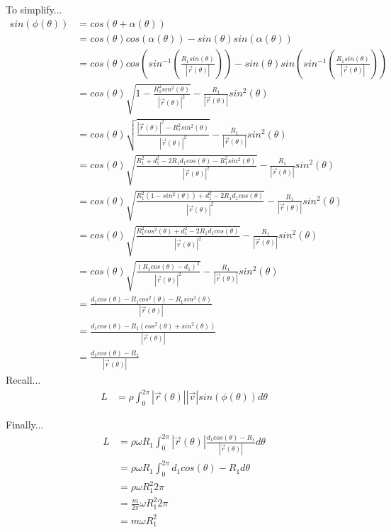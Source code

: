 \documentclass{article}
\begin{document}
	To simplify...
	\begin{align}
		sin(\phi(\theta)) &= cos(\theta + \alpha(\theta)) \\
		 &= cos(\theta)cos(\alpha(\theta)) - sin(\theta)sin(\alpha(\theta)) \\
		 &= cos(\theta)cos(sin^{-1}(\frac{R_1sin(\theta)}{|\vec{r}(\theta)|})) - sin(\theta)sin(sin^{-1}(\frac{R_1sin(\theta)}{|\vec{r}(\theta)|})) \\
		 &= cos(\theta)\sqrt{1-\frac{R_1^2sin^2(\theta)}{|\vec{r}(\theta)|^2}} - \frac{R_1}{|\vec{r}(\theta)|}sin^2(\theta) \\
		 &= cos(\theta)\sqrt{\frac{|\vec{r}(\theta)|^2 - R_1^2sin^2(\theta)}{|\vec{r}(\theta)|^2}} - \frac{R_1}{|\vec{r}(\theta)|}sin^2(\theta) \\
		 &= cos(\theta)\sqrt{\frac{R_1^2+d_1^2-2R_1d_1cos(\theta)- R_1^2sin^2(\theta)}{|\vec{r}(\theta)|^2}} - \frac{R_1}{|\vec{r}(\theta)|}sin^2(\theta) \\
		 &= cos(\theta)\sqrt{\frac{R_1^2(1-sin^2(\theta))+d_1^2-2R_1d_1cos(\theta)}{|\vec{r}(\theta)|^2}} - \frac{R_1}{|\vec{r}(\theta)|}sin^2(\theta) \\
		 &= cos(\theta)\sqrt{\frac{R_1^2cos^2(\theta)+d_1^2-2R_1d_1cos(\theta)}{|\vec{r}(\theta)|^2}} - \frac{R_1}{|\vec{r}(\theta)|}sin^2(\theta) \\
		 &= cos(\theta)\sqrt{\frac{(R_1cos(\theta) - d_1)^2}{|\vec{r}(\theta)|^2}} - \frac{R_1}{|\vec{r}(\theta)|}sin^2(\theta) \\
		 &= \frac{d_1cos(\theta) - R_1cos^2(\theta) - R_1sin^2(\theta)}{|\vec{r}(\theta)|} \\
		 &= \frac{d_1cos(\theta) - R_1(cos^2(\theta) + sin^2(\theta))}{|\vec{r}(\theta)|} \\
		 &= \frac{d_1cos(\theta) - R_1}{|\vec{r}(\theta)|}
	\end{align}
	Recall...
	\begin{align}
		L &= \rho\int_0^{2\pi}|\vec{r}(\theta)||\vec{v}|sin(\phi(\theta))d\theta
	\end{align}

	Finally...
	\begin{align}
		L &=\rho\omega R_1\int_0^{2\pi}|\vec{r}(\theta)|\frac{d_1cos(\theta) - R_1}{|\vec{r}(\theta)|}d\theta \\
		 &= \rho\omega R_1\int_0^{2\pi}d_1cos(\theta) - R_1 d\theta \\
		 &= \rho\omega R_1^2 2\pi \\
		 &= \frac{m}{2\pi} \omega R_1^2 2\pi  \\
		 &= m \omega R_1^2
	\end{align}
	
\end{document}

